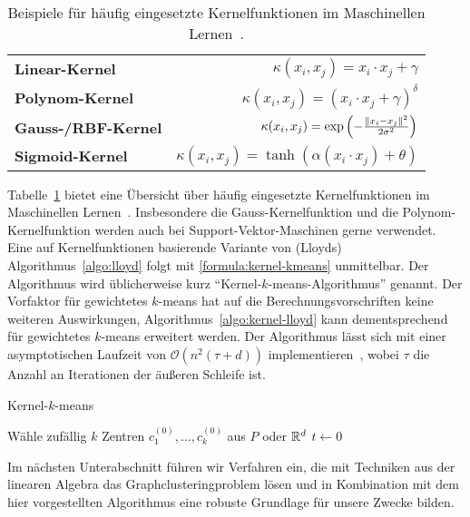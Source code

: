\begin{table}[t]
\centering
\begin{tabular}{@{}lr@{}} \toprule
	\textbf{Linear-Kernel} & $\kappa(x_i, x_j) = x_i \cdot x_j + \gamma $ \\
	\textbf{Polynom-Kernel} & $\kappa(x_i, x_j) = \left( x_i \cdot x_j + \gamma \right)^\delta$ \\
	\textbf{Gauss-/RBF-Kernel} & $\kappa(x_i, x_j) = \exp \left( - \frac{\lVert {x_i} - {x_j} \rVert^2}{2 \sigma^2} \right)$ \\
	\textbf{Sigmoid-Kernel} & $\kappa(x_i, x_j) = \tanh(\alpha(x_i \cdot x_j) + \theta) $ \\ \bottomrule
\end{tabular}
\caption{Beispiele für häufig eingesetzte Kernelfunktionen im Maschinellen Lernen~\cite{HofmannSS08}.}
\label{tbl:kernel-functions}
\end{table}
Tabelle~\ref{tbl:kernel-functions} bietet eine Übersicht über häufig eingesetzte Kernelfunktionen im Maschinellen
Lernen~\cite{HofmannSS08}. Insbesondere
die Gauss-Kernelfunktion und die Polynom-Kernelfunktion werden auch bei Support-Vektor-Maschinen gerne verwendet.
\absatz
Eine auf Kernelfunktionen basierende Variante von (Lloyds) Algorithmus~\ref{algo:lloyd} folgt mit \ref{formula:kernel-kmeans}
unmittelbar. Der Algorithmus wird üblicherweise kurz "`Kernel-$k$-means-Algorithmus"' genannt.
Der Vorfaktor für gewichtetes $k$-means hat auf die Berechnungsvorschriften keine weiteren Auswirkungen,
Algorithmus~\ref{algo:kernel-lloyd} kann dementsprechend für gewichtetes $k$-means erweitert werden. Der Algorithmus
lässt sich mit einer asymptotischen Laufzeit von $\mathcal{O}(n^2 (\tau + d))$ implementieren~\cite{DhillonGK04,DhillonGK07},
wobei $\tau$ die Anzahl an Iterationen der äußeren Schleife ist.
\absatz
\begin{algorithm}
\label{algo:kernel-lloyd}
\caption{Kernel-$k$-means}
	\DontPrintSemicolon
	
	\BlankLine
	
	Wähle zufällig $k$ Zentren $c_1^{(0)}, \dots, c_k^{(0)}$ aus $P$ oder $\mathbb{R}^{d}$\;
	$t \leftarrow 0$\;
\end{algorithm}
Im nächsten Unterabschnitt führen wir Verfahren ein, die mit Techniken aus der linearen Algebra das Graphclusteringproblem
lösen und in Kombination mit dem hier vorgestellten Algorithmus eine robuste Grundlage für unsere Zwecke bilden.

